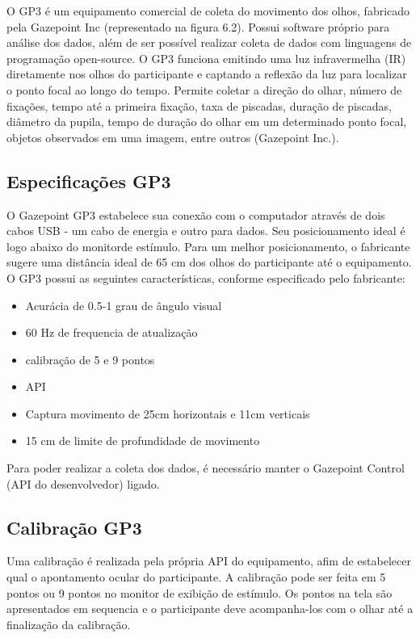 O GP3 é um equipamento comercial de coleta do movimento dos olhos, 
fabricado pela Gazepoint Inc (representado na figura 6.2). Possui software próprio para análise dos dados, 
além de ser possível realizar coleta de dados com linguagens de programação open-source. O GP3 funciona emitindo uma luz infravermelha (IR) 
diretamente nos olhos do participante e captando a reflexão da luz para localizar o ponto focal ao longo do tempo. 
Permite coletar a direção do olhar, número de fixações, tempo até a primeira fixação, taxa de piscadas,
 duração de piscadas, diâmetro da pupila, tempo de duração do olhar em um determinado ponto focal, 
 objetos observados em uma imagem, entre outros (Gazepoint Inc.).


\subsection{Especificações GP3}

O Gazepoint GP3 estabelece sua conexão com o computador através de dois cabos USB - um cabo de energia e outro para dados.
Seu posicionamento ideal é logo abaixo do monitorde estímulo. Para um melhor posicionamento, o fabricante 
sugere uma distância ideal de 65 cm dos olhos do participante até o equipamento. O GP3 possui as seguintes características, conforme
especificado pelo fabricante:

\begin{itemize}
    \item Acurácia de 0.5-1 grau de ângulo visual
    \item 60 Hz de frequencia de atualização
    \item calibração de 5 e 9 pontos
    \item API
    \item Captura movimento de 25cm horizontais e 11cm verticais
    \item 15 cm de limite de profundidade de movimento
\end{itemize}

Para poder realizar a coleta dos dados, é necessário manter o Gazepoint Control (API do desenvolvedor) ligado. 

\subsection{Calibração GP3}
Uma calibração é realizada pela própria API do equipamento, afim de estabelecer qual o apontamento ocular do participante. 
A calibração pode ser feita em 5 pontos ou 9 pontos no monitor de exibição de estímulo. Os pontos na tela são apresentados
em sequencia e o participante deve acompanha-los com o olhar até a finalização da calibração. 

